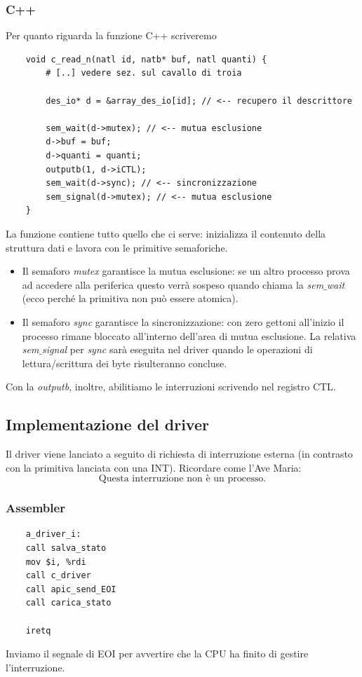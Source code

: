 \subsubsection{C++} Per quanto riguarda la funzione C++ scriveremo
\begin{verbatim}
	void c_read_n(natl id, natb* buf, natl quanti) {
		# [..] vedere sez. sul cavallo di troia
		
		des_io* d = &array_des_io[id]; // <-- recupero il descrittore
		
		sem_wait(d->mutex); // <-- mutua esclusione
		d->buf = buf;
		d->quanti = quanti;
		outputb(1, d->iCTL);
		sem_wait(d->sync); // <-- sincronizzazione
		sem_signal(d->mutex); // <-- mutua esclusione
	}
\end{verbatim}
La funzione contiene tutto quello che ci serve: inizializza il contenuto della struttura dati e lavora con le primitive semaforiche.
\begin{itemize}
	\item Il semaforo \emph{mutex} garantisce la mutua esclusione: se un altro processo prova ad accedere alla periferica questo verrà sospeso quando chiama la \emph{sem$\_$wait} (ecco perché la primitiva non può essere atomica).
	\item Il semaforo \emph{sync} garantisce la sincronizzazione: con zero gettoni all'inizio il processo rimane bloccato all'interno dell'area di mutua esclusione. La relativa \emph{sem$\_$signal} per \emph{sync} sarà eseguita nel driver quando le operazioni di lettura/scrittura dei byte risulteranno concluse.
\end{itemize} 
Con la \emph{outputb}, inoltre, abilitiamo le interruzioni scrivendo nel registro CTL.
\subsection{Implementazione del driver}
Il driver viene lanciato a seguito di richiesta di interruzione esterna (in contrasto con la primitiva lanciata con una INT). Ricordare come l'Ave Maria:
\[\boxed{\text{Questa interruzione non è un processo.}}\]
\subsubsection{Assembler}
\begin{verbatim}
	a_driver_i:
	call salva_stato
	mov $i, %rdi
	call c_driver
	call apic_send_EOI
	call carica_stato
	
	iretq
\end{verbatim}
Inviamo il segnale di EOI per avvertire che la CPU ha finito di gestire l'interruzione. 
